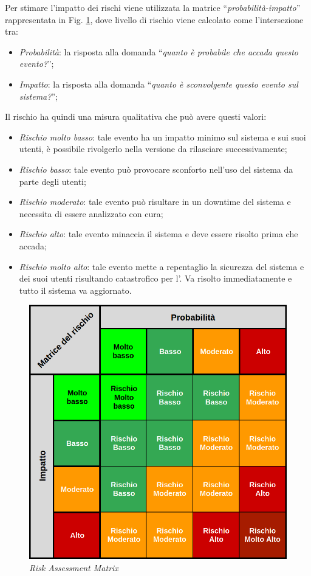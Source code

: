 	Per stimare l'impatto dei rischi viene utilizzata la matrice ``\textit{probabilità-impatto}'' rappresentata in Fig. \ref{fig:risk_matrix}, dove livello di rischio viene calcolato come l'intersezione tra:
	\begin{itemize}[noitemsep]
		\item \textit{Probabilità}: la risposta alla domanda ``\textit{quanto è probabile che accada questo evento?}'';
		\item \textit{Impatto}: la risposta alla domanda ``\textit{quanto è sconvolgente questo evento sul sistema?}'';
	\end{itemize}
	Il rischio ha quindi una misura qualitativa che può avere questi valori:
	\begin{itemize}[noitemsep]
		\item \textit{Rischio molto basso}: tale evento ha un impatto minimo sul sistema e sui suoi utenti, è possibile rivolgerlo nella versione da rilasciare successivamente;
		\item \textit{Rischio basso}: tale evento può provocare sconforto nell'uso del sistema da parte degli utenti;
		\item \textit{Rischio moderato}: tale evento può risultare in un downtime del sistema e necessita di essere analizzato con cura;
		\item \textit{Rischio alto}: tale evento minaccia il sistema e deve essere risolto prima che accada;
		\item \textit{Rischio molto alto}: tale evento mette a repentaglio la sicurezza del sistema e dei suoi utenti risultando catastrofico per l'\istituto. 
		Va risolto immediatamente e tutto il sistema va aggiornato.
	\end{itemize}
	
	\begin{figure}[h!]
		\centering
		\includegraphics[width=\linewidth]{img/matrix.png}
		\caption{\textit{Risk Assessment Matrix}}
		\label{fig:risk_matrix}
	\end{figure}

